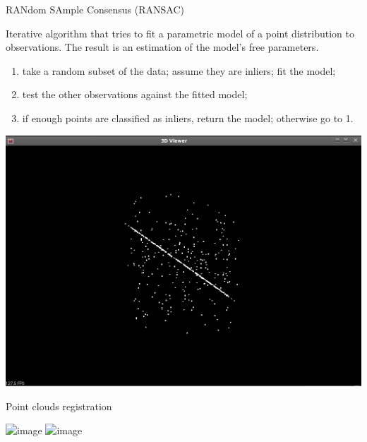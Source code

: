 \documentclass[compress]{beamer}
\begin{document}
{
\begin{frame}{RANdom SAmple Consensus (RANSAC)}
    
    Iterative algorithm that tries
    to {\Medium fit a parametric model} of a point distribution to
    observations. The result is an {\Medium estimation of the model's free
    parameters}.

    \begin{multicols}{2}
    
    \footnotesize
    \begin{enumerate}
        \item take a random subset of the data; assume they are {\Medium inliers}; fit the model;
        \item test the other observations against the fitted model;
        \item if enough points are classified as inliers, return the model; otherwise go to 1.
    \end{enumerate}

    \begin{center}
        \includegraphics[width=0.8\linewidth]{ransac_outliers_plane}
    \end{center}
    \end{multicols}


\end{frame}
}

{
\begin{frame}{Point clouds registration}
    \begin{center}
        \includegraphics<1>[width=\linewidth]{scans}
        \includegraphics<2>[width=0.8\linewidth]{registered}
    \end{center}

\end{frame}
}
\end{document}
